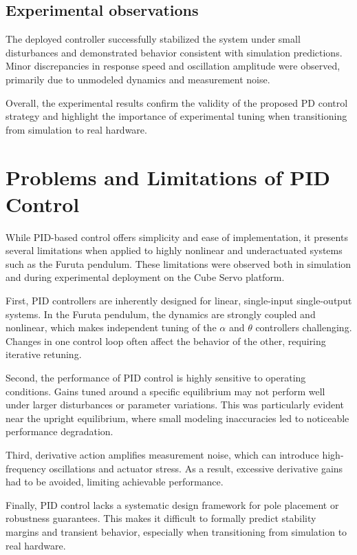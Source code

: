 \documentclass[12pt,a4paper]{article}
\begin{document}
\subsection{Experimental observations}

The deployed controller successfully stabilized the system under small disturbances and demonstrated behavior consistent with simulation predictions. Minor discrepancies in response speed and oscillation amplitude were observed, primarily due to unmodeled dynamics and measurement noise.

Overall, the experimental results confirm the validity of the proposed PD control strategy and highlight the importance of experimental tuning when transitioning from simulation to real hardware.


\section{Problems and Limitations of PID Control}

While PID-based control offers simplicity and ease of implementation, it presents several limitations when applied to highly nonlinear and underactuated systems such as the Furuta pendulum. These limitations were observed both in simulation and during experimental deployment on the Cube Servo platform.

First, PID controllers are inherently designed for linear, single-input single-output systems. In the Furuta pendulum, the dynamics are strongly coupled and nonlinear, which makes independent tuning of the $\alpha$ and $\theta$ controllers challenging. Changes in one control loop often affect the behavior of the other, requiring iterative retuning.

Second, the performance of PID control is highly sensitive to operating conditions. Gains tuned around a specific equilibrium may not perform well under larger disturbances or parameter variations. This was particularly evident near the upright equilibrium, where small modeling inaccuracies led to noticeable performance degradation.

Third, derivative action amplifies measurement noise, which can introduce high-frequency oscillations and actuator stress. As a result, excessive derivative gains had to be avoided, limiting achievable performance.

Finally, PID control lacks a systematic design framework for pole placement or robustness guarantees. This makes it difficult to formally predict stability margins and transient behavior, especially when transitioning from simulation to real hardware.
\end{document}
